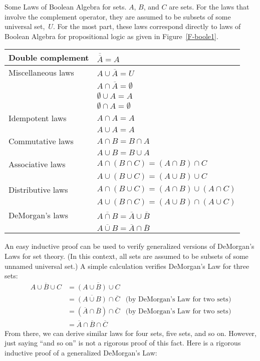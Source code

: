   {Some Laws of Boolean Algebra for sets.  $A$, $B$, and $C$ are
  sets.  For the laws that involve the complement operator, 
  they are assumed to be subsets of some universal set,~$U$.
  For the most part, these laws correspond directly to laws
  of Boolean Algebra for propositional logic as given in
  Figure~\ref{F-boole1}.}
  {\begin{tabular}{|l|l|}
      \hline
      \strut Double complement&   \bigstrut$\overline{\overline{A}}=A$\\
      \hline
      \strut Miscellaneous laws&   $A\cup\overline{A}=U$\\
      \strut&    $A\cap\overline{A}=\emptyset$\\
      \strut&    $\emptyset\cup A=A$\\
      \strut&    $\emptyset\cap A=\emptyset$\\
      \hline
      \strut Idempotent laws&    $A\cap A= A$\\
      \strut&                   $A\cup A= A$\\
      \hline
      \strut Commutative laws&   $A\cap B = B\cap A$\\
      \strut&                   $A\cup B=B\cup A$\\
      \hline
      \strut Associative laws&   $A\cap (B\cap C) = (A\cap B)\cap C$\\
      \strut&                   $A\cup (B\cup C) = (A\cup B)\cup C$\\
      \hline
      \strut Distributive laws&  $A\cap(B\cup C) = (A\cap B)\cup (A\cap C)$\\
      \strut&                   $A\cup (B\cap C) = (A\cup B)\cap (A\cup C)$\\
      \hline
      \strut DeMorgan's laws&   $\overline{A\cap B} = \overline{A}\cup\overline{B}$\\
      \strut&                   $\overline{A\cup B} = \overline{A}\cap\overline{B}$\\
      \hline
   \end{tabular}
  }

\medbreak

An easy inductive proof
can be used to verify generalized versions of DeMorgan's Laws
for set theory.  
(In this context, all sets are assumed to be subsets of some unnamed
universal set.)  A simple calculation verifies DeMorgan's
Law for three sets:
\begin{align*}
   \overline{A\cup B\cup C}&=\overline{(A\cup B)\cup C}\\
             &=\overline{(A\cup B)}\cap\overline{C} &\text{(by DeMorgan's Law for two sets)}\\
             &=(\overline{A}\cap\overline{B})\cap\overline{C} &\text{(by DeMorgan's Law for two sets)}\\
             &=\overline{A}\cap\overline{B}\cap\overline{C}
\end{align*}
From there, we can derive similar laws for four sets, five sets, and
so on.  However, just saying ``and so on'' is not a rigorous
proof of this fact.  Here is a rigorous inductive proof of a generalized
DeMorgan's Law:

